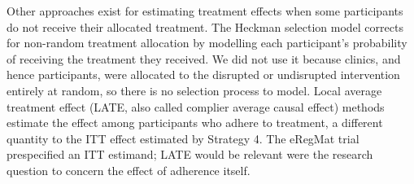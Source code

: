 Other approaches exist for estimating treatment effects when some
participants do not receive their allocated treatment. The Heckman
selection model \citep{heckman1979} corrects for non-random treatment
allocation by modelling each participant's probability of receiving the
treatment they received. We did not use it because clinics, and hence
participants, were allocated to the disrupted or undisrupted intervention
entirely at random, so there is no selection process to model. Local
average treatment effect (LATE, also called complier average causal
effect) methods \citep{angrist1995,troncoso2022} estimate the effect
among participants who adhere to treatment, a different quantity to the
ITT effect estimated by Strategy 4. The eRegMat trial prespecified an ITT
estimand; LATE would be relevant were the research question to concern
the effect of adherence itself.





\endinput
